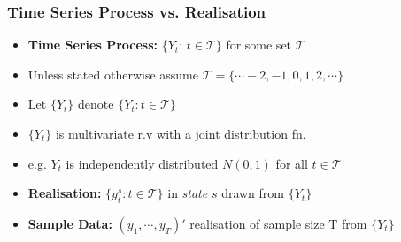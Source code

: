 \documentclass{beamer}
\begin{document}
		
		\begin{frame}
			
			\frametitle{Time Series Process vs. Realisation}
			
			\begin{itemize}
				\normalsize		
				\item[]\textbf{Time Series Process: } \{$Y_t$: $t\in \mathcal{T}\}$ for some set $\mathcal{T}$
				\pause
				\vspace{10pt}
				\item[] \hspace{25pt} Unless stated otherwise assume $\mathcal{T}=\{\cdots -2,-1,0,1,2,\cdots\}$
				\item[] \hspace{25pt} Let $\{Y_t\}$ denote $\{Y_t: t\in \mathcal{T}\}$
				\pause
				\vspace{25pt}
				\item[]   $\{Y_t\}$ is multivariate r.v with a joint distribution fn.	\pause
				\item[] \hspace{25pt} e.g. $Y_t$ is  independently distributed $N(0,1)$ for all $t\in \mathcal{T}$
				
				\pause
				\vspace{25pt}
				\item[] \textbf{Realisation:} $\{y_t^s: t\in \mathcal{T}\}$ in \textit{state} $s$ 	 drawn from  $\{Y_t\}$ 
				\vspace{25pt}
				\pause
				\item[] \textbf{Sample Data:} $(y_1,\cdots,y_T)'$  realisation of sample size T from  $\{Y_t\}$ 
				\pause
				
				
			\end{itemize}
		\end{frame}
		
\end{document}
